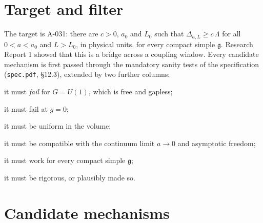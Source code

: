 \documentclass[11pt,a4paper]{article}
\newcommand{\idref}[1]{\textsf{#1}}
\begin{document}
\section{Target and filter}\label{sec:target}

The target is \idref{A-031}: there are $c>0$, $a_0$ and $L_0$ such that $\Delta_{a,L}\ge c\,\Lambda$ for all $0<a<a_0$ and $L>L_0$, in physical units, for every compact simple $\mathfrak g$. Research Report 1 showed that this is a bridge across a coupling window. Every candidate mechanism is first passed through the mandatory sanity tests of the specification (\texttt{spec.pdf}, \S12.3), extended by two further columns:
\begin{description}[font=\normalfont\sffamily,leftmargin=1.3cm,labelwidth=1.1cm,align=left]
\item[Ab] it must \emph{fail} for $G=U(1)$, which is free and gapless;
\item[Free] it must fail at $g=0$;
\item[Vol] it must be uniform in the volume;
\item[UV] it must be compatible with the continuum limit $a\to0$ and asymptotic freedom;
\item[All $\mathfrak g$] it must work for every compact simple $\mathfrak g$;
\item[Rig.] it must be rigorous, or plausibly made so.
\end{description}

\section{Candidate mechanisms}\label{sec:funnel}
\end{document}
